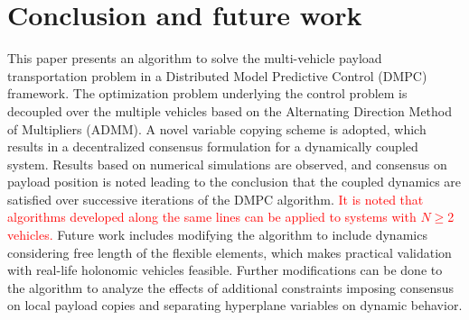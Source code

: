\documentclass[letterpaper, 10 pt, conference]{ieeeconf}
\begin{document}
 \section{Conclusion and future work}
This paper presents an algorithm to solve the multi-vehicle payload transportation problem in a Distributed Model Predictive Control (DMPC) framework. The optimization problem underlying the control problem is decoupled over the multiple vehicles based on the Alternating Direction Method of Multipliers (ADMM). A novel variable copying scheme is adopted, which results in a decentralized consensus formulation for a dynamically coupled system. Results based on numerical simulations are observed, and consensus on payload position is noted leading to the conclusion that the coupled dynamics are satisfied over successive iterations of the DMPC algorithm. \textcolor{red}{It is noted that algorithms developed along the same lines can be applied to systems with $N\geq$2 vehicles.} Future work includes modifying the algorithm to include dynamics considering free length of the flexible elements, which makes practical validation with real-life holonomic vehicles feasible. Further modifications can be done to the algorithm to analyze the effects of additional constraints imposing consensus on local payload copies and separating hyperplane variables on dynamic behavior.


\end{document}
